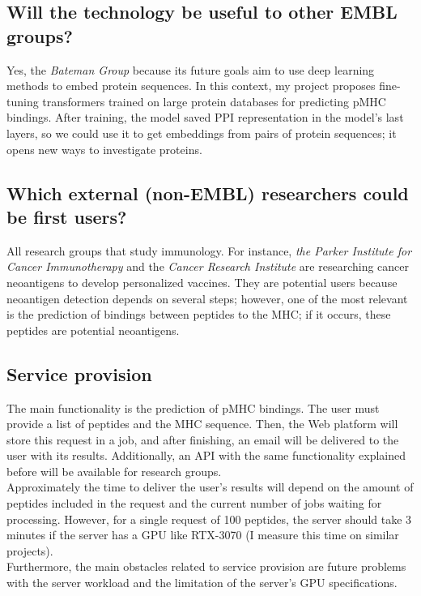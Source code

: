 \documentclass[a4paper,11pt]{article}
\begin{document}
\subsection{Will the technology be useful to other EMBL groups?}
Yes, the \textit{Bateman Group} because its future goals aim to use deep learning methods to embed protein sequences. In this context, my project proposes fine-tuning transformers trained on large protein databases for predicting pMHC bindings. After training, the model saved PPI representation in the model's last layers, so we could use it to get embeddings from pairs of protein sequences; it opens new ways to investigate proteins.

\subsection{Which external (non-EMBL) researchers could be first users?}
All research groups that study immunology. For instance, \textit{the Parker Institute for Cancer Immunotherapy} and the \textit{Cancer Research Institute} are researching cancer neoantigens to develop personalized vaccines. They are potential users because neoantigen detection depends on several steps; however, one of the most relevant is the prediction of bindings between peptides to the MHC; if it occurs, these peptides are potential neoantigens.

\subsection{Service provision}
The main functionality is the prediction of pMHC bindings. The user must provide a list of peptides and the MHC sequence. Then, the Web platform will store this request in a job, and after finishing, an email will be delivered to the user with its results. Additionally, an API with the same functionality explained before will be available for research groups. \\

Approximately the time to deliver the user's results will depend on the amount of peptides included in the request and the current number of jobs waiting for processing. However, for a single request of 100 peptides, the server should take 3 minutes if the server has a GPU like RTX-3070 (I measure this time on similar projects).\\

Furthermore, the main obstacles related to service provision are future problems with the server workload and the limitation of the server's GPU specifications. 
\end{document}
